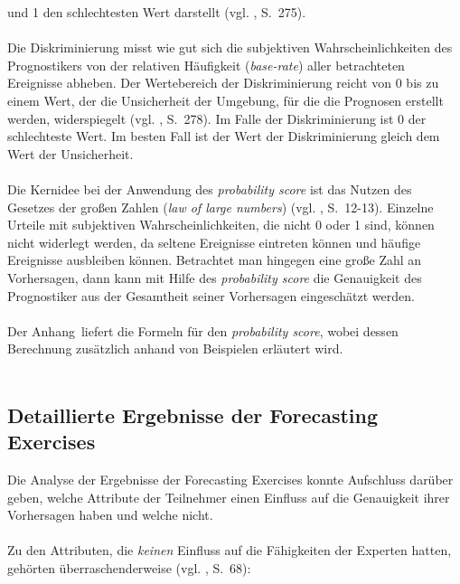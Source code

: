 und 1 den schlechtesten Wert darstellt (vgl. \cite{Tetlock}, S.~275). \\ \\
Die Diskriminierung misst wie gut sich die subjektiven Wahrscheinlichkeiten des 
Prognostikers von der relativen Häufigkeit (\emph{base-rate}) aller betrachteten
Ereignisse abheben. Der Wertebereich der Diskriminierung reicht von 0 bis zu
einem Wert, der die Unsicherheit der Umgebung, für die die Prognosen erstellt
werden, widerspiegelt (vgl. \cite{Tetlock}, S.~278). Im Falle der
Diskriminierung ist 0 der schlechteste Wert. Im besten Fall ist der Wert der
Diskriminierung gleich dem Wert der Unsicherheit. \\ \\
Die Kernidee bei der Anwendung des \emph{probability score} ist das Nutzen
des Gesetzes der großen Zahlen (\emph{law of large numbers})
(vgl. \cite{Tetlock}, S.~12-13). Einzelne Urteile mit subjektiven
Wahrscheinlichkeiten, die nicht 0 oder 1 sind, können nicht widerlegt werden,
da seltene Ereignisse eintreten können und häufige Ereignisse ausbleiben können.
Betrachtet man hingegen eine große Zahl an Vorhersagen, dann kann mit Hilfe
des \emph{probability score} die Genauigkeit des Prognostiker aus der Gesamtheit
seiner Vorhersagen eingeschätzt werden. \\ \\
Der Anhang~\xcom liefert die Formeln für den \emph{probability score}, wobei
dessen Berechnung zusätzlich anhand von Beispielen erläutert wird. \\ \\

\subsection{Detaillierte Ergebnisse der Forecasting Exercises}

Die Analyse der Ergebnisse der Forecasting Exercises konnte Aufschluss
darüber geben, welche Attribute der Teilnehmer einen Einfluss auf die
Genauigkeit ihrer Vorhersagen haben und welche nicht. \\ \\
Zu den Attributen, die \emph{keinen} Einfluss auf die Fähigkeiten der Experten
hatten, gehörten überraschenderweise (vgl. \cite{Tetlock}, S.~68):

